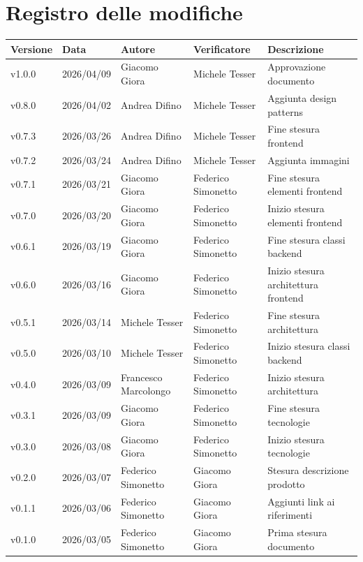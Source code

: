 \documentclass[a4paper,12pt]{article}
\begin{document}
\section*{Registro delle modifiche}
\begin{center}
    \begin{tabularx}{\textwidth}{|l|l|l|X|X|}
        \hline
        \rowcolor{lightgray}
        \textbf{Versione}  & \textbf{Data}       & \textbf{Autore}      & \textbf{Verificatore} & \textbf{Descrizione} \\
        \hline
        v1.0.0 & 2026/04/09 & Giacomo Giora & Michele Tesser & Approvazione documento \\
        \hline
        v0.8.0 & 2026/04/02 & Andrea Difino & Michele Tesser & Aggiunta design patterns \\
        \hline
        v0.7.3 & 2026/03/26 & Andrea Difino & Michele Tesser & Fine stesura frontend\\
        \hline
        v0.7.2 & 2026/03/24 & Andrea Difino & Michele Tesser & Aggiunta immagini\\
        \hline
        v0.7.1 & 2026/03/21 & Giacomo Giora & Federico Simonetto & Fine stesura elementi frontend\\
        \hline
        v0.7.0 & 2026/03/20 & Giacomo Giora & Federico Simonetto & Inizio stesura elementi frontend\\
        \hline
        v0.6.1 & 2026/03/19 & Giacomo Giora & Federico Simonetto & Fine stesura classi backend\\
        \hline
        v0.6.0 & 2026/03/16 & Giacomo Giora & Federico Simonetto & Inizio stesura architettura frontend\\
        \hline
        v0.5.1 & 2026/03/14 & Michele Tesser & Federico Simonetto & Fine stesura architettura\\
        \hline
        v0.5.0 & 2026/03/10 & Michele Tesser & Federico Simonetto & Inizio stesura classi backend \\
        \hline
        v0.4.0 & 2026/03/09 & Francesco Marcolongo & Federico Simonetto & Inizio stesura architettura \\
        \hline
        v0.3.1 & 2026/03/09 & Giacomo Giora & Federico Simonetto & Fine stesura tecnologie \\
        \hline
        v0.3.0 & 2026/03/08 & Giacomo Giora & Federico Simonetto & Inizio stesura tecnologie \\
        \hline
        v0.2.0 & 2026/03/07 & Federico Simonetto & Giacomo Giora & Stesura descrizione prodotto \\
        \hline
        v0.1.1 & 2026/03/06 & Federico Simonetto & Giacomo Giora & Aggiunti link ai riferimenti \\
        \hline
        v0.1.0 & 2026/03/05 & Federico Simonetto & Giacomo Giora & Prima stesura documento \\
        \hline
    \end{tabularx}
\end{center}
\end{document}
